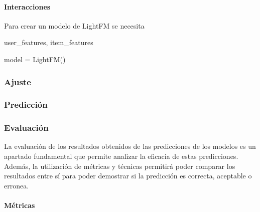 \paragraph{Interacciones}


Para crear un modelo de LightFM se necesita

user\_features, item\_features 

model = LightFM() 


\subsubsection{Ajuste}
\subsubsection{Predicción}


\subsubsection{Evaluación}
La evaluación de los resultados obtenidos de las predicciones de los modelos es un apartado fundamental que permite analizar la eficacia de estas predicciones. Además, la utilización de métricas y técnicas permitirá poder comparar los resultados entre sí para poder demostrar si la predicción es correcta, aceptable o erronea.
\paragraph{Métricas}
